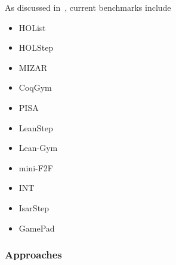 \documentclass{article}
\begin{document}
    As discussed in~\cite{lu_survey_nodate}, current benchmarks include
    \begin{itemize}
        \item HOList~\cite{bansal_holist_2019}
        \item HOLStep~\cite{kaliszyk_holstep_2017}
        \item MIZAR~\cite{jakubuv_mizar_2023, grabowski_four_2015}
        \item CoqGym~\cite{yang_learning_2019}
        \item PISA~\cite{jiang_lisa_2021}
        \item LeanStep~\cite{han_proof_2021}
        \item Lean-Gym~\cite{polu_formal_2022}
        \item mini-F2F~\cite{zheng_minif2f_2021}
        \item INT~\cite{wu_int_2020}
        \item IsarStep~\cite{li_isarstep_2020}
        \item GamePad~\cite{huang_gamepad_2018}
    \end{itemize}


    \subsubsection{Approaches}

%
%
%
%
%
%
%
%
%
%
\end{document}
